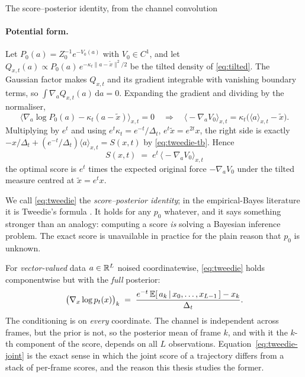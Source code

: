 \begin{toolbox}[tb:sm-tweedie]{The score--posterior identity, from the channel convolution}
\paragraph{Potential form.}
Let $P_0(a)=Z_0^{-1}e^{-V_0(a)}$ with $V_0\in C^1$, and let $Q_{x,t}(a)\propto
P_0(a)\,e^{-\kappa_t\lVert a-\tilde x\rVert^2/2}$ be the tilted density of
\eqref{eq:tilted}. The Gaussian factor makes $Q_{x,t}$ and its gradient integrable with
vanishing boundary terms, so $\int\nabla_a Q_{x,t}(a)\,\mathrm da=0$. Expanding the
gradient and dividing by the normaliser,
\[
  \big\langle \nabla_a\log P_0(a)-\kappa_t(a-\tilde x)\big\rangle_{x,t}=0
  \quad\Longrightarrow\quad
  \big\langle -\nabla_a V_0\big\rangle_{x,t}=\kappa_t\big(\langle a\rangle_{x,t}-\tilde x\big).
\]
Multiplying by $e^{t}$ and using $e^{t}\kappa_t=e^{-t}/\Delta_t$, $e^{t}\tilde x=e^{2t}x$,
the right side is exactly $-x/\Delta_t+(e^{-t}/\Delta_t)\langle a\rangle_{x,t}=S(x,t)$ by
\eqref{eq:tweedie-tb}. Hence
\begin{equation}
  \boxed{\;S(x,t)\;=\;e^{t}\,\big\langle -\nabla_a V_0\big\rangle_{x,t}\;}
  \label{eq:potentialform}
\end{equation}
the optimal score is $e^{t}$ times the expected original force $-\nabla_a V_0$ under the
tilted measure centred at $\tilde x=e^{t}x$.
\end{toolbox}

We call \eqref{eq:tweedie} the \emph{score--posterior identity}; in the
empirical-Bayes literature it is Tweedie's formula
\citep{robbins1956empirical, miyasawa1961empirical, efron2011tweedie,
vincent2011connection}. It holds for any $p_0$ whatever, and it says something
stronger than an analogy: computing a score \emph{is} solving a Bayesian
inference problem. The exact score is unavailable in practice for the plain
reason that $p_0$ is unknown.

For \emph{vector-valued} data $a \in \mathbb{R}^{L}$ noised coordinatewise,
\eqref{eq:tweedie} holds componentwise but with the \emph{full} posterior:
\begin{equation}
  \big( \nabla_x \log p_t(x) \big)_k
  \;=\; \frac{e^{-t}\, \mathbb{E}[\,a_k \,|\, x_0, \dots, x_{L-1}\,] - x_k}{\Delta_t}.
  \label{eq:tweedie-joint}
\end{equation}
The conditioning is on \emph{every} coordinate. The channel is independent
across frames, but the prior is not, so the posterior mean of frame $k$, and
with it the $k$-th component of the score, depends on all $L$ observations.
Equation~\eqref{eq:tweedie-joint} is the exact sense in which the joint score
of a trajectory differs from a stack of per-frame scores, and the reason this
thesis studies the former.

